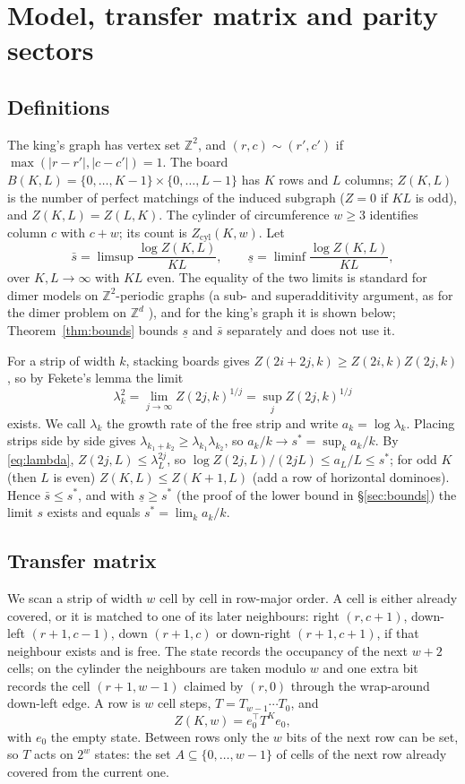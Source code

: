 \documentclass[11pt]{amsart}
\theoremstyle{definition}
\theoremstyle{remark}
\newcommand{\Z}{\mathbb{Z}}
\begin{document}
\section{Model, transfer matrix and parity sectors}\label{sec:model}

\subsection{Definitions}
The king's graph has vertex set $\Z^2$, and $(r, c) \sim (r', c')$ if
$\max(|r - r'|, |c - c'|) = 1$. The board $B(K, L) = \{0, \dots, K-1\} \times \{0, \dots, L-1\}$
has $K$ rows and $L$ columns; $Z(K, L)$ is the number of perfect matchings of the induced
subgraph ($Z = 0$ if $KL$ is odd), and $Z(K, L) = Z(L, K)$. The cylinder of circumference
$w \ge 3$ identifies column $c$ with $c + w$; its count is $Z_{\mathrm{cyl}}(K, w)$. Let
\[
  \bar s = \limsup \frac{\log Z(K, L)}{KL}, \qquad \underline s = \liminf \frac{\log Z(K, L)}{KL},
\]
over $K, L \to \infty$ with $KL$ even. The equality of the two limits is standard for dimer
models on $\Z^2$-periodic graphs (a sub- and superadditivity argument, as for the dimer problem on
$\Z^d$ \cite{friedlandpeled2005}), and for the king's graph it is shown below;
Theorem~\ref{thm:bounds} bounds $\underline s$ and $\bar s$ separately and does not use it.

For a strip of width $k$, stacking boards gives $Z(2i + 2j, k) \ge Z(2i, k) Z(2j, k)$, so by
Fekete's lemma \cite{fekete1923} the limit
\begin{equation}\label{eq:lambda}
  \lambda_k^2 = \lim_{j \to \infty} Z(2j, k)^{1/j} = \sup_j Z(2j, k)^{1/j}
\end{equation}
exists. We call $\lambda_k$ the growth rate of the free strip and write $a_k = \log \lambda_k$.
Placing strips side by side gives $\lambda_{k_1 + k_2} \ge \lambda_{k_1}\lambda_{k_2}$, so
$a_k/k \to s^* = \sup_k a_k/k$. By \eqref{eq:lambda}, $Z(2j, L) \le \lambda_L^{2j}$, so
$\log Z(2j, L)/(2jL) \le a_L/L \le s^*$; for odd $K$ (then $L$ is even) $Z(K, L) \le Z(K+1, L)$
(add a row of horizontal dominoes). Hence $\bar s \le s^*$, and with $\underline s \ge s^*$ (the
proof of the lower bound in \S\ref{sec:bounds}) the limit $s$ exists and equals
$s^* = \lim_k a_k/k$.

\subsection{Transfer matrix}
We scan a strip of width $w$ cell by cell in row-major order. A cell is either already covered,
or it is matched to one of its later neighbours: right $(r, c+1)$, down-left $(r+1, c-1)$, down
$(r+1, c)$ or down-right $(r+1, c+1)$, if that neighbour exists and is free. The state records
the occupancy of the next $w + 2$ cells; on the cylinder the neighbours are taken modulo $w$ and
one extra bit records the cell $(r+1, w-1)$ claimed by $(r, 0)$ through the wrap-around
down-left edge. A row is $w$ cell steps, $T = T_{w-1}\cdots T_0$, and
\[
  Z(K, w) = e_0^{\top} T^K e_0,
\]
with $e_0$ the empty state. Between rows only the $w$ bits of the next row can be set, so $T$
acts on $2^w$ states: the set $A \subseteq \{0, \dots, w-1\}$ of cells of the next row already
covered from the current one.
\end{document}
